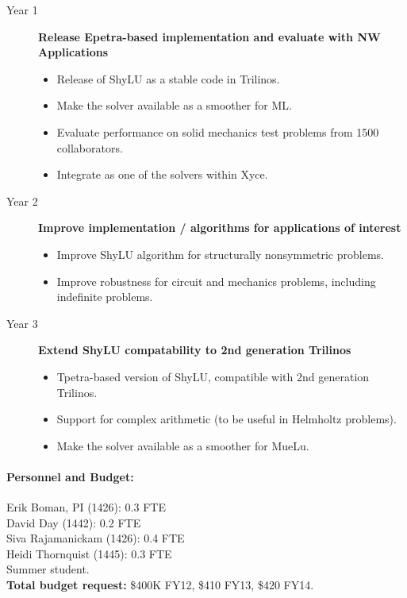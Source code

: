 \documentclass[10pt]{amsart}
\begin{document}
\begin{description}
\item[Year 1] {\bf Release Epetra-based implementation and evaluate with NW Applications}
  \begin{itemize} 
  \item Release of ShyLU as a stable code in Trilinos.
  \item Make the solver available as a smoother for ML.
  \item Evaluate performance on solid mechanics test problems from 1500 collaborators.
  \item Integrate as one of the solvers within Xyce.
  \end{itemize}
\item[Year 2] {\bf Improve implementation / algorithms for applications of interest}
  \begin{itemize}
  \item Improve ShyLU algorithm for structurally nonsymmetric problems.
  \item Improve robustness for circuit and mechanics problems, including indefinite problems.
  \end{itemize}
\item[Year 3] {\bf Extend ShyLU compatability to 2nd generation Trilinos}
  \begin{itemize}
  \item Tpetra-based version of ShyLU, compatible with 2nd generation Trilinos.
  \item Support for complex arithmetic (to be useful in Helmholtz problems).
  \item Make the solver available as a smoother for MueLu.
  \end{itemize}
\end{description}


\paragraph{\bf Personnel and Budget:}
Erik Boman, PI (1426): 0.3 FTE\\
David Day (1442): 0.2 FTE\\
Siva Rajamanickam (1426): 0.4 FTE\\
Heidi Thornquist (1445): 0.3 FTE\\
Summer student.\\
%
\textbf{Total budget request:} \$400K FY12, \$410 FY13, \$420 FY14.
\end{document}
